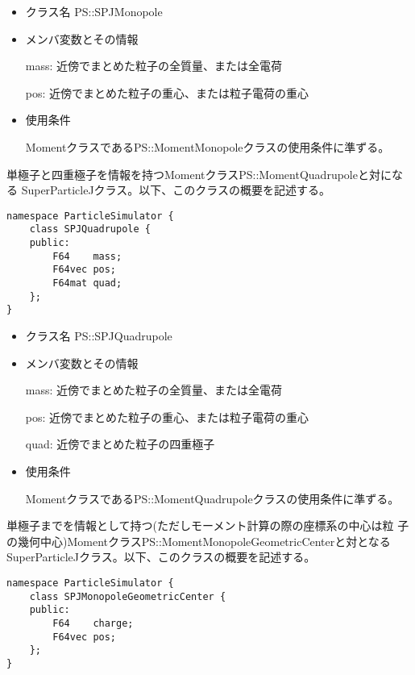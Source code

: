 \begin{itemize}
\item クラス名
  PS::SPJMonopole

\item メンバ変数とその情報

  mass: 近傍でまとめた粒子の全質量、または全電荷

  pos: 近傍でまとめた粒子の重心、または粒子電荷の重心

\item 使用条件

  MomentクラスであるPS::MomentMonopoleクラスの使用条件に準ずる。

\end{itemize}

\label{sec:SPJQuadrupole}

単極子と四重極子を情報を持つMomentクラスPS::MomentQuadrupoleと対になる
SuperParticleJクラス。以下、このクラスの概要を記述する。
\begin{screen}
\begin{verbatim}
namespace ParticleSimulator {
    class SPJQuadrupole {
    public:
        F64    mass;
        F64vec pos;
        F64mat quad;
    };
}
\end{verbatim}
\end{screen}

\begin{itemize}
\item クラス名
  PS::SPJQuadrupole

\item メンバ変数とその情報

  mass: 近傍でまとめた粒子の全質量、または全電荷

  pos: 近傍でまとめた粒子の重心、または粒子電荷の重心

  quad: 近傍でまとめた粒子の四重極子

\item 使用条件

  MomentクラスであるPS::MomentQuadrupoleクラスの使用条件に準ずる。

\end{itemize}

\label{sec:SPJMonopoleGeometricCenter}

単極子までを情報として持つ(ただしモーメント計算の際の座標系の中心は粒
子の幾何中心)MomentクラスPS::MomentMonopoleGeometricCenterと対となる
SuperParticleJクラス。以下、このクラスの概要を記述する。
\begin{screen}
\begin{verbatim}
namespace ParticleSimulator {
    class SPJMonopoleGeometricCenter {
    public:
        F64    charge;    
        F64vec pos;
    };
}
\end{verbatim}
\end{screen}

